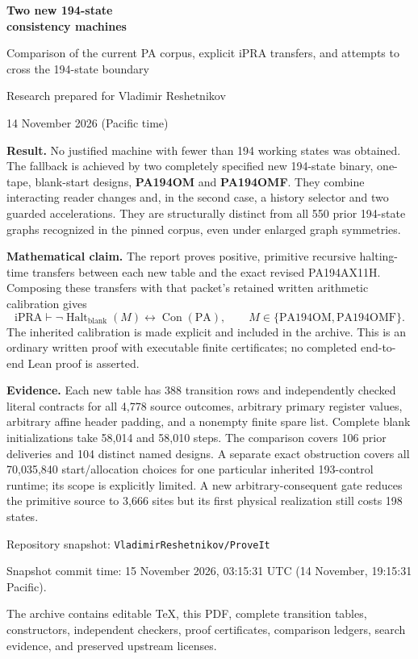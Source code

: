 \documentclass[11pt,a4paper]{article}
\newcommand{\iPRA}{\mathrm{iPRA}}
\newcommand{\PA}{\mathrm{PA}}
\newcommand{\Con}{\operatorname{Con}}
\newcommand{\Halt}{\operatorname{Halt}_{\mathrm{blank}}}
\begin{document}
\begin{titlepage}
\vspace*{12mm}
{\color{ink}\Huge\bfseries Two new 194-state\\[3pt]consistency machines\par}
\vspace{5mm}
{\Large Comparison of the current PA corpus, explicit iPRA transfers,
and attempts to cross the 194-state boundary\par}
\vspace{10mm}
{\large Research prepared for Vladimir Reshetnikov\par}
{\large 14 November 2026 (Pacific time)\par}
\vspace{8mm}
\textbf{Result.} No justified machine with fewer than 194 working states
was obtained. The fallback is achieved by two completely specified new
194-state binary, one-tape, blank-start designs, \textbf{PA194OM} and
\textbf{PA194OMF}. They combine interacting reader changes and, in the
second case, a history selector and two guarded accelerations. They are
structurally distinct from all 550 prior 194-state graphs recognized in
the pinned corpus, even under enlarged graph symmetries.

\textbf{Mathematical claim.} The report proves positive, primitive
recursive halting-time transfers between each new table and the exact
revised PA194AX11H. Composing these transfers with that packet's retained
written arithmetic calibration gives
\[
 \iPRA\vdash\neg\Halt(M)\longleftrightarrow\Con(\PA),
 \qquad M\in\{\mathrm{PA194OM},\mathrm{PA194OMF}\}.
\]
The inherited calibration is made explicit and included in the archive.
This is an ordinary written proof with executable finite certificates;
no completed end-to-end Lean proof is asserted.

\textbf{Evidence.} Each new table has 388 transition rows and independently
checked literal contracts for all 4,778 source outcomes, arbitrary primary
register values, arbitrary affine header padding, and a nonempty finite
spare list. Complete blank initializations take 58,014 and 58,010 steps.
The comparison covers 106 prior deliveries and 104 distinct named designs.
A separate exact obstruction covers all 70,035,840 start/allocation choices
for one particular inherited 193-control runtime; its scope is explicitly
limited. A new arbitrary-consequent gate reduces the primitive source to
3,666 sites but its first physical realization still costs 198 states.

\vfill
\small
Repository snapshot: \texttt{VladimirReshetnikov/ProveIt}\par
{}\par
Snapshot commit time: 15 November 2026, 03:15:31 UTC
(14 November, 19:15:31 Pacific).\par
The archive contains editable TeX, this PDF, complete transition tables,
constructors, independent checkers, proof certificates, comparison ledgers,
search evidence, and preserved upstream licenses.
\end{titlepage}
\end{document}
